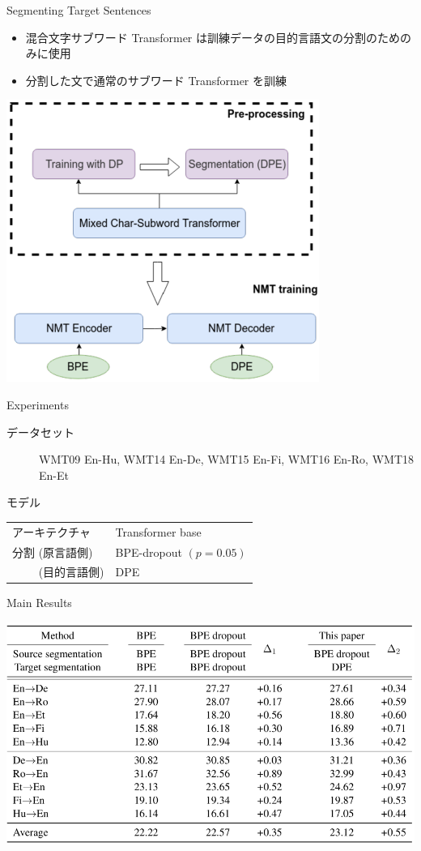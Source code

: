 \documentclass[unicode, 12pt, aspectratio=43]{beamer}
\begin{document}
\begin{frame}[label={sec:org9b9b696}]{Segmenting Target Sentences}
\begin{itemize}
\item 混合文字サブワード Transformer は訓練データの目的言語文の分割のためのみに使用
\item 分割した文で通常のサブワード Transformer を訓練
\end{itemize}
\begin{center}
\includegraphics[width=0.5\linewidth]{./figure/Figure3.pdf}
\end{center}
\end{frame}

\begin{frame}[label={sec:orgca68eed}]{Experiments}
\begin{description}
\item[{データセット}] WMT09 En-Hu, WMT14 En-De, WMT15 En-Fi, WMT16 En-Ro, WMT18 En-Et
\item[{モデル}] 
\end{description}
\begin{center}
\begin{tabular}{ll}
\toprule
アーキテクチャ & Transformer base\\
分割 (原言語側) & BPE-dropout \((p=0.05)\)\\
　　 (目的言語側) & DPE\\
\bottomrule
\end{tabular}
\end{center}
\end{frame}

\begin{frame}[label={sec:orgeacdf02}]{Main Results}
\begin{center}
\includegraphics[width=\linewidth]{./figure/Table2.pdf}
\end{center}
\end{frame}
\end{document}
